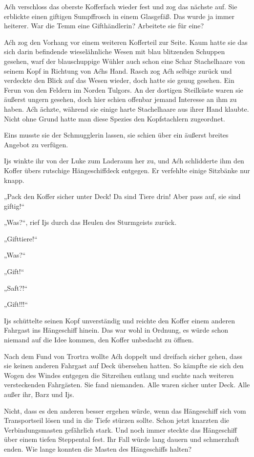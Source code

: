 Aćh verschloss das oberste Kofferfach wieder fest und zog das nächste auf. Sie erblickte einen giftigen Sumpffrosch in einem Glasgefäß. Das wurde ja immer heiterer. War die Temm eine Gifthändlerin? Arbeitete sie für eine?

Aćh zog den Vorhang vor einem weiteren Kofferteil zur Seite. Kaum hatte sie das sich darin befindende wieselähnliche Wesen mit blau blitzenden Schuppen gesehen, warf der blauschuppige Wühler auch schon eine Schar Stachelhaare von seinem Kopf in Richtung von Aćhs Hand. Rasch zog Aćh selbige zurück und verdeckte den Blick auf das Wesen wieder, doch hatte sie genug gesehen. Ein Ferun von den Feldern im Norden Tulgors. An der dortigen Steilküste waren sie äußerst ungern gesehen, doch hier schien offenbar jemand Interesse an ihm zu haben. Aćh ächzte, während sie einige harte Stachelhaare aus ihrer Hand klaubte. Nicht ohne Grund hatte man diese Spezies den Kopfstachlern zugeordnet.

Eins musste sie der Schmugglerin lassen, sie schien über ein äußerst breites Angebot zu verfügen.

Ijs winkte ihr von der Luke zum Laderaum her zu, und Aćh schlidderte ihm den Koffer übers rutschige Hängeschiffdeck entgegen. Er verfehlte einige Sitzbänke nur knapp.

„Pack den Koffer sicher unter Deck! Da sind Tiere drin! Aber pass auf, sie sind giftig!“

„Was?“, rief Ijs durch das Heulen des Sturmgeists zurück.

„Gifttiere!“

„Was?“

„Gift!“

„Saft?!“

„Gift!!!“

Ijs schüttelte seinen Kopf unverständig und reichte den Koffer einem anderen Fahrgast ins Hängeschiff hinein. Das war wohl in Ordnung, es würde schon niemand auf die Idee kommen, den Koffer unbedacht zu öffnen.

Nach dem Fund von Trortra wollte Aćh doppelt und dreifach sicher gehen, dass sie keinen anderen Fahrgast auf Deck übersehen hatten. So kämpfte sie sich den Wogen des Windes entgegen die Sitzreihen entlang und suchte nach weiteren versteckenden Fahrgästen. Sie fand niemanden. Alle waren sicher unter Deck. Alle außer ihr, Barz und Ijs.

Nicht, dass es den anderen besser ergehen würde, wenn das Hängeschiff sich vom Transportseil lösen und in die Tiefe stürzen sollte. Schon jetzt knarzten die Verbindungsmasten gefährlich stark. Und noch immer steckte das Hängeschiff über einem tiefen Steppental fest. Ihr Fall würde lang dauern und schmerzhaft enden. Wie lange konnten die Masten des Hängeschiffs halten?

